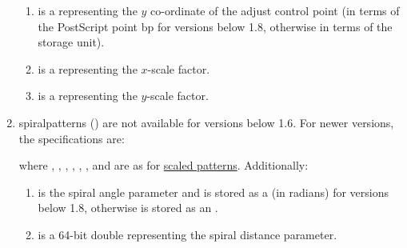 \begin{numbered}
\begin{enumerate}
\begin{enumerate}
    \item {} is a  representing the
    $y$ \gls{co-ordinate} of the adjust control point (in terms of the
    PostScript point \gls{bp} for versions below 1.8, otherwise in terms
    of the storage unit).

    \item {} is a  representing the
     $x$-scale factor.

    \item {} is a  representing the
     $y$-scale factor.
    \end{enumerate}%

  \item\label{jdr:spiral}%
  \Glspl{spiralpattern} () are not available for versions below 1.6.
  For newer versions, the specifications are:
  \begin{syntaxline}
     
      
  \end{syntaxline}
  where , , ,
  , , ,  and
   are as for \hyperref[jdr:scaled]{scaled patterns}. Additionally:
    \begin{enumerate}
    \item {} is the spiral angle
    parameter and is stored as a  (in radians) for
    versions below 1.8, otherwise is stored as an .

    \item {} is a 64-bit double representing the spiral
      distance parameter.
    \end{enumerate}%
  \end{enumerate}%
\end{numbered}%

